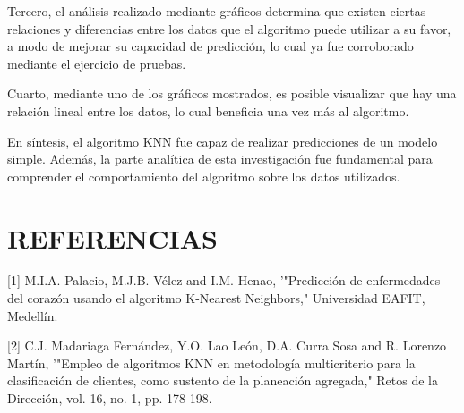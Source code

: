 \documentclass{article_saj}
\begin{document}
\indent

Tercero, el análisis realizado mediante gráficos determina que existen ciertas relaciones y diferencias entre los datos que el algoritmo puede utilizar a su favor, a modo de mejorar su capacidad de predicción, lo cual ya fue corroborado mediante el ejercicio de pruebas. 

\indent

Cuarto, mediante uno de los gráficos mostrados, es posible visualizar que hay una relación lineal entre los datos, lo cual beneficia una vez más al algoritmo.

\indent

En síntesis, el algoritmo KNN fue capaz de realizar predicciones de un modelo simple. Además, la parte analítica de esta investigación fue fundamental para comprender el comportamiento del algoritmo sobre los datos utilizados. 

\section*{REFERENCIAS}
\begin{referencias}

[1]  \: M.I.A. Palacio, M.J.B. Vélez and I.M. Henao, '"Predicción de enfermedades del corazón usando el algoritmo K-Nearest Neighbors," Universidad EAFIT, Medellín.


[2]  \:   C.J. Madariaga Fernández, Y.O. Lao León, D.A. Curra Sosa and R. Lorenzo Martín, '"Empleo de algoritmos KNN en metodología multicriterio para la clasificación de clientes, como sustento de la planeación agregada," Retos de la Dirección, vol. 16, no. 1, pp. 178-198.


\end{referencias}
 


\end{document}
